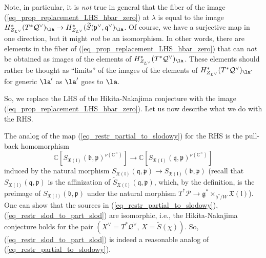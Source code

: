 \documentclass[12pt]{amsart}
\begin{document}
    Note, in particular, it is {\emph{not}} true in general that the fiber of the image (\ref{eq_prop_replacement_LHS_hbar_zero}) at $\lambda$ is equal to the image $H^*_{Z_{L^\vee}}(T^*\mathcal{Q}^\vee)_\la 
    \rightarrow H^*_{Z_{L^\vee}}(\widetilde{S}(\mathfrak{p}^\vee,\mathfrak{q}^\vee)_{\la}$. Of course, we have a surjective map in one direction, but it might {\emph{not}} be an isomorphism. In other words, there are elements in the fiber of (\ref{eq_prop_replacement_LHS_hbar_zero}) that can  {\emph{not}} be obtained as images of the elements of $H^*_{Z_{L^\vee}}(T^*\mathcal{Q}^\vee)_{\la}$. These elements should rather  be thought as ``limits'' of the images of the elements of $H^*_{Z_{L^\vee}}(T^*\mathcal{Q}^\vee)_{\la'}$ for generic $\la'$  as $\la'$ goes to $\la$.


    So, we replace the LHS of the Hikita-Nakajima conjecture with the image (\ref{eq_prop_replacement_LHS_hbar_zero}). Let us now describe what we do with the RHS. 

    The analog of the map (\ref{eq_restr_partial_to_slodowy}) for the RHS is the pull-back homomorphism
    \begin{equation}\label{eq_restr_slod_to_part_slod}
    \mathbb{C}[S_{\mathfrak{X}(\mathfrak{l})}(\mathfrak{b},\mathfrak{p})^{\nu(\mathbb{C}^\times)}] \rightarrow \mathbb{C}[S_{\mathfrak{X}(\mathfrak{l})}(\mathfrak{q},\mathfrak{p})^{\nu(\mathbb{C}^\times)}]
    \end{equation}
    induced by the natural morphism 
   $
    S_{\mathfrak{X}(\mathfrak{l})}(\mathfrak{q},\mathfrak{p}) \rightarrow  S_{\mathfrak{X}(\mathfrak{l})}(\mathfrak{b},\mathfrak{p})$
    (recall that $S_{\mathfrak{X}(\mathfrak{l})}(\mathfrak{q},\mathfrak{p})$ is the affinization of $\widetilde{S}_{\mathfrak{X}(\mathfrak{l})}(\mathfrak{q},\mathfrak{p})$, which, by the definition, is the preimage of $S_{\mathfrak{X}(\mathfrak{l})}(\mathfrak{b},\mathfrak{p})$ under the natural morphism $T^*\mathcal{P} \rightarrow \mathfrak{g}^* \times_{\mathfrak{h}^*/W} \mathfrak{X}(\mathfrak{l})$). One can show that the sources in (\ref{eq_restr_partial_to_slodowy}), (\ref{eq_restr_slod_to_part_slod}) are isomorphic, i.e., the Hikita-Nakajima conjecture holds for the pair $(X^\vee=T^*\mathcal{Q}^\vee,\,X=\widetilde{S}(\chi))$. So, (\ref{eq_restr_slod_to_part_slod}) is indeed a reasonable analog of (\ref{eq_restr_partial_to_slodowy}). 
    
\end{document}
